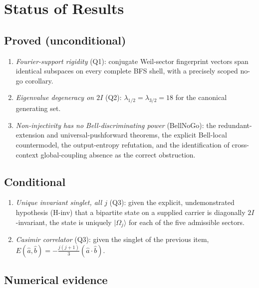 \documentclass[11pt,a4paper]{article}
\theoremstyle{definition}
\newcommand{\twoI}{2I}
\begin{document}
  \section{Status of Results}
    \label{sec:status}

    \subsection{Proved (unconditional)}
      \label{sec:proved}

      \begin{enumerate}
        \item \textit{Fourier-support rigidity} (Q1): conjugate Weil-sector fingerprint vectors
        span identical subspaces on every complete BFS shell, with a precisely scoped no-go
        corollary.
        \item \textit{Eigenvalue degeneracy on $\twoI$} (Q2): $\lambda_{1/2} = \lambda_{3/2} = 18$
        for the canonical generating set.
        \item \textit{Non-injectivity has no Bell-discriminating power} (BellNoGo): the
        redundant-extension and universal-pushforward theorems, the explicit Bell-local
        countermodel, the output-entropy refutation, and the identification of cross-context
        global-coupling absence as the correct obstruction.
      \end{enumerate}

    \subsection{Conditional}
      \label{sec:conditional}

      \begin{enumerate}
        \item \textit{Unique invariant singlet, all $j$} (Q3): given the explicit, undemonstrated
        hypothesis (H-inv) that a bipartite state on a supplied carrier is diagonally
        $\twoI$-invariant, the state is uniquely $|\Omega_j\rangle$ for each of the five
        admissible sectors.
        \item \textit{Casimir correlator} (Q3): given the singlet of the previous item,
        $E(\hat{a},\hat{b}) = -\tfrac{j(j+1)}{3}(\hat{a}\cdot\hat{b})$.
      \end{enumerate}

    \subsection{Numerical evidence}
      \label{sec:numerical}
\end{document}
